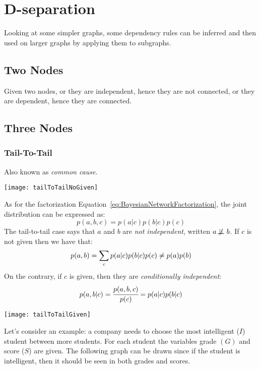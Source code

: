 \section{D-separation}
Looking at some simpler graphs, some dependency rules can be inferred and then used on larger graphs by applying them to subgraphs.
%
%
\subsection{Two Nodes}
Given two nodes, or they are independent, hence they are not connected, or they are dependent, hence they are connected.
%
%
\subsection{Three Nodes}
%
\subsubsection{Tail-To-Tail}
Also known as \textit{common cause}.
\begin{center}
	\texttt{[image: tailToTailNoGiven]}
\end{center}
As for the factorization Equation~\ref{eq:BayesianNetworkFactorization}, the joint distribution can be expressed as:
\[
	p(a,b,c)=p(a\vert c)p(b\vert c)p(c)
\]
The tail-to-tail case says that $a$ and $b$ are \textit{not independent}, written $a \not\!\perp\!\!\!\perp b$. %
If $c$ is not given then we have that:
\[
	p(a,b)=\displaystyle\sum_cp(a\vert c)p(b\vert c)p(c)\neq p(a)p(b)
\] 
On the contrary, if $c$ is given, then they are \textit{conditionally independent}:
\[
p(a,b\vert c)=\cfrac{p(a,b,c)}{p(c)}=p(a\vert c)p(b\vert c)
\] 
\begin{center}
	\texttt{[image: tailToTailGiven]}
\end{center}
Let's consider an example: a company needs to choose the most intelligent ($I$) student between more students. For each student the variables grade $(G)$ and score ($S$) are given. The following graph can be drawn since if the student is intelligent, then it should be seen in both grades and scores. \newline
